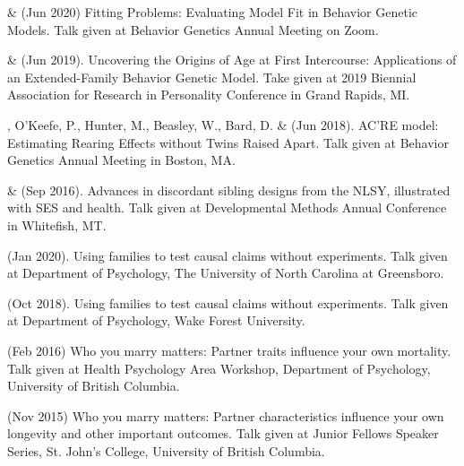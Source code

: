 
\item \meb \& \Joe (Jun 2020) Fitting Problems: Evaluating Model Fit in Behavior Genetic Models. Talk given at Behavior Genetics Annual Meeting on Zoom.
%
\item \meb \& \Joe (Jun 2019). Uncovering the Origins of Age at First Intercourse: Applications of an Extended-Family Behavior Genetic Model. Take given at 2019 Biennial Association for Research in Personality Conference in Grand Rapids, MI.

\item\meb, O'Keefe, P., Hunter, M., Beasley, W., Bard, D. \& \Joe (Jun 2018). AC'RE model: Estimating Rearing Effects without Twins Raised Apart. Talk given at Behavior Genetics Annual Meeting in Boston, MA.
%
\item\meb \& \joe (Sep 2016). Advances in discordant sibling designs from the NLSY, illustrated with SES and health. Talk given at Developmental Methods Annual Conference in Whitefish, MT.\smallskip\\
%
\item\meb (Jan 2020). Using families to test causal claims without experiments. Talk given at Department of Psychology, The University of North Carolina at Greensboro.
%
%
%
\item\meb (Oct 2018). Using families to test causal claims without experiments. Talk given at Department of Psychology, Wake Forest University.
%
\item \meb (Feb 2016) Who you marry matters: Partner traits influence your own mortality. Talk given at Health Psychology Area Workshop, Department of Psychology, University of British Columbia. 
%
\item \meb (Nov 2015) Who you marry matters: Partner characteristics influence your own longevity and other important outcomes. Talk given at Junior Fellows Speaker Series, St. John's College, University of British Columbia. 
